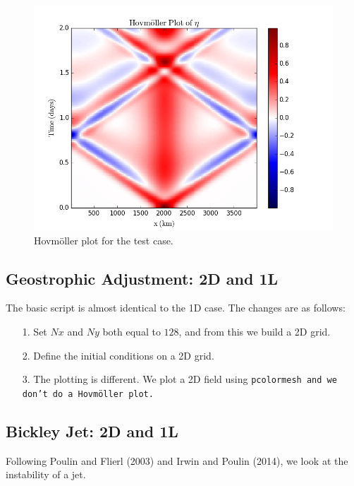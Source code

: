 \documentclass[11pt]{article}
\begin{document}
\begin{figure}[h]
\begin{center}
\includegraphics[width=12cm]{Figures/ex1_fig2.png}
\caption{Hovm\"oller plot for the test case.}
\end{center}
\end{figure}

\subsection*{Geostrophic Adjustment: 2D and 1L}

The basic script is almost identical to the 1D case.  The changes are as follows:
\begin{itemize}
\item[1.] Set $Nx$ and $Ny$ both equal to $128$, and from this we build a 2D grid.   
\item[2.] Define the initial conditions on a 2D grid.
\item[3.] The plotting is different.  We plot a 2D field using \tt{pcolormesh} and we don't do a Hovm\"oller plot.
\end{itemize}

\subsection*{Bickley Jet: 2D and 1L}

Following Poulin and Flierl (2003) and Irwin and Poulin (2014), we look at the instability of a jet.
\end{document}
